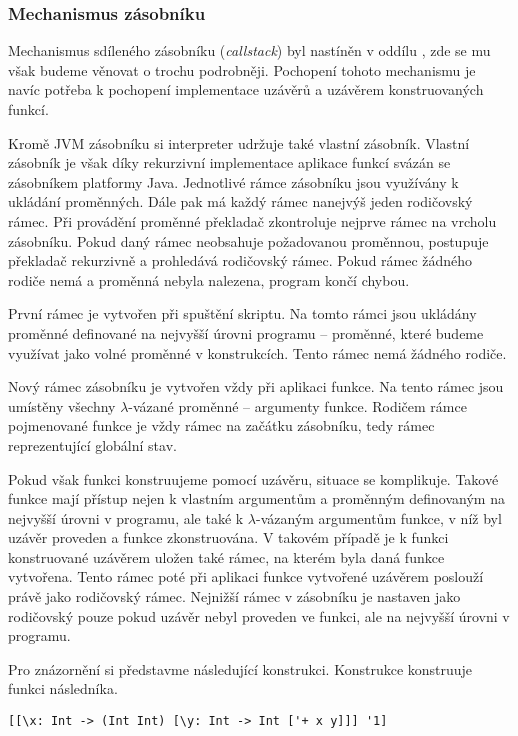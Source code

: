 \subsubsection{Mechanismus zásobníku}

Mechanismus sdíleného zásobníku (\textit{callstack}) byl nastíněn v oddílu
, zde se mu však budeme věnovat o trochu podrobněji.
Pochopení tohoto mechanismu je navíc potřeba k pochopení implementace uzávěrů a uzávěrem
konstruovaných funkcí.

Kromě JVM zásobníku si interpreter udržuje také vlastní zásobník. Vlastní zásobník je však díky
rekurzivní implementace aplikace funkcí svázán se zásobníkem platformy Java. Jednotlivé rámce
zásobníku jsou využívány k ukládání proměnných. Dále pak má každý rámec nanejvýš jeden rodičovský
rámec. Při provádění proměnné překladač zkontroluje nejprve rámec na vrcholu zásobníku. Pokud daný
rámec neobsahuje požadovanou proměnnou, postupuje překladač rekurzivně a prohledává rodičovský
rámec. Pokud rámec žádného rodiče nemá a proměnná nebyla nalezena, program končí chybou.

První rámec je vytvořen při spuštění skriptu. Na tomto rámci jsou ukládány proměnné definované
na nejvyšší úrovni programu -- proměnné, které budeme využívat jako volné proměnné v konstrukcích.
Tento rámec nemá žádného rodiče.

Nový rámec zásobníku je vytvořen vždy při aplikaci funkce. Na tento rámec jsou umístěny
všechny $\lambda$-vázané proměnné -- argumenty funkce. Rodičem rámce pojmenované funkce je vždy rámec
na začátku zásobníku, tedy rámec reprezentující globální stav.

Pokud však funkci konstruujeme pomocí uzávěru, situace se komplikuje. Takové funkce mají přístup
nejen k vlastním argumentům a proměnným definovaným na nejvyšší úrovni v programu, ale také
k $\lambda$-vázaným argumentům funkce, v níž byl uzávěr proveden a funkce zkonstruována. V takovém
případě je k funkci konstruované uzávěrem uložen také rámec, na kterém byla daná funkce vytvořena.
Tento rámec poté při aplikaci funkce vytvořené uzávěrem poslouží právě jako rodičovský rámec.
Nejnižší rámec v zásobníku je nastaven jako rodičovský pouze pokud uzávěr nebyl proveden ve funkci,
ale na nejvyšší úrovni v programu.

Pro znázornění si představme následující konstrukci. Konstrukce konstruuje funkci následníka.

\begin{lstlisting}[caption={Funkce následníka pomocí vnořených uzávěrů}]
[[\x: Int -> (Int Int) [\y: Int -> Int ['+ x y]]] '1]
\end{lstlisting}

